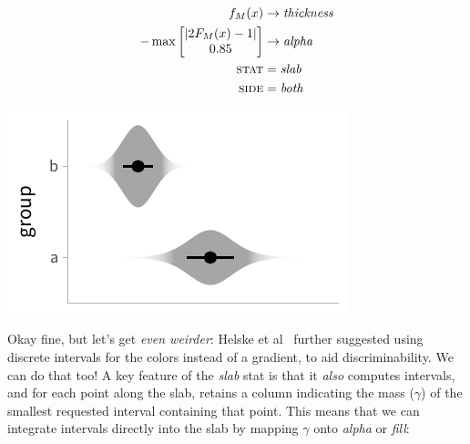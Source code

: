 \documentclass[journal]{vgtc}                     %
\begin{document}
 \noindent
\begin{minipage}{.5\columnwidth}

\begin{align*}
f_M(x) &\rightarrow \textit{thickness}\\
-\max \left[ \begin{matrix} \lvert 2 F_M(x) - 1 \rvert \\ 0.85 \end{matrix} \right] &\rightarrow \textit{alpha}\\
\textsc{stat} &= \mathit{slab}\\
\textsc{side} &= \mathit{both}
\end{align*}
\end{minipage}%
  \begin{minipage}{.4\columnwidth}
    \centering
    \includegraphics[width=1.2\columnwidth]{figs/3-slab_violin_gradient.pdf}
  \end{minipage}
\hfill\break

Okay fine, but let's get \textit{even weirder}: Helske et al~\cite{helske2021can} further suggested using discrete intervals for the colors instead of a gradient, to aid discriminability. We can do that too! A key feature of the \textit{slab} stat is that it \textit{also} computes intervals, and for each point along the slab, retains a column indicating the mass ($\gamma$) of the smallest requested interval containing that point. This means that we can integrate intervals directly into the slab by mapping $\gamma$ onto \textit{alpha} or \textit{fill}:
\end{document}
